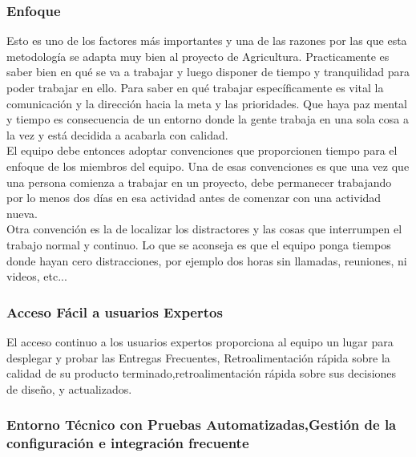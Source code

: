 \subsubsection{Enfoque}
Esto es uno de los factores más importantes y una de las razones por las que esta metodología se adapta muy bien al proyecto de Agricultura. Practicamente es saber bien en qué se va a trabajar y luego disponer de tiempo y tranquilidad para poder trabajar en ello. Para saber en qué trabajar específicamente es vital la comunicación y la dirección hacia la meta y las prioridades. Que haya paz mental y tiempo es consecuencia de un entorno donde la gente trabaja en una sola cosa a la vez y está decidida a acabarla con calidad.\\

El equipo debe entonces adoptar convenciones que proporcionen tiempo para el enfoque de los miembros del equipo. Una de esas convenciones es que una vez que una persona comienza a trabajar en un proyecto, debe permanecer trabajando por lo menos dos días en esa actividad antes de comenzar con una actividad nueva.\\

Otra convención es la de localizar los distractores y las cosas que interrumpen el trabajo normal y continuo. Lo que se aconseja es que el equipo ponga tiempos donde hayan cero distracciones, por ejemplo dos horas sin llamadas, reuniones, ni videos, etc...\\

\subsubsection{Acceso Fácil a usuarios Expertos}
El acceso continuo a los usuarios expertos proporciona al equipo un lugar para desplegar y probar las Entregas Frecuentes,
Retroalimentación rápida sobre la calidad de su producto terminado,retroalimentación rápida sobre sus decisiones de diseño, y
actualizados.\cite{cockburn2004crystal}

\subsubsection{Entorno Técnico con Pruebas Automatizadas,Gestión de la configuración e integración frecuente}

